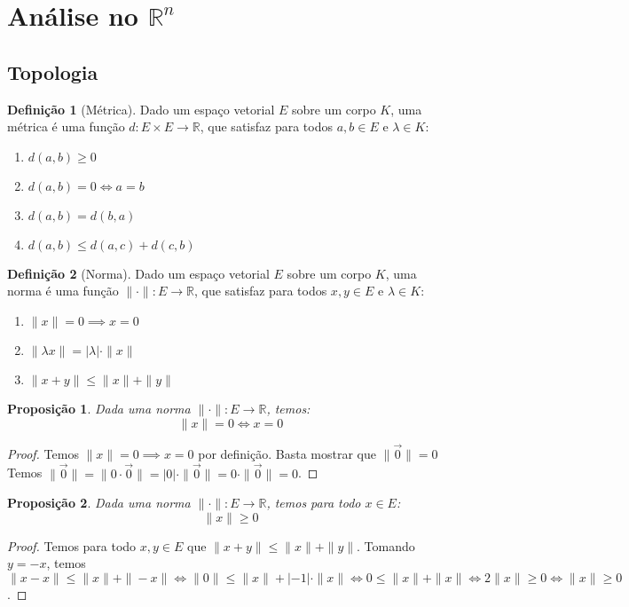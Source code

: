\documentclass{article}
\theoremstyle{plain}
\newtheorem{prop}{Proposição}[section]
\theoremstyle{definition}
\newtheorem{definicao}{Definição}[section]
\theoremstyle{remark}
\begin{document}
\section{Análise no $\mathbb{R}^n$}
\subsection{Topologia}
\begin{definicao}[Métrica]
	Dado um espaço vetorial $E$ sobre um corpo $K$, uma métrica é uma função $d: E\times E \to \mathbb{R}$, que satisfaz para todos $a,b\in E$ e $\lambda \in K$:
	\begin{enumerate}
		\item $d(a,b) \geq 0$
		\item $d(a,b) = 0 \iff a = b $
		\item $d(a,b) = d(b,a)$
		\item $ d(a,b) \leq d(a,c) + d(c,b)$
	\end{enumerate}
\end{definicao}
\begin{definicao}[Norma]
	Dado um espaço vetorial $E$ sobre um corpo $K$, uma norma é uma função $\| \cdot \|: E \to \mathbb{R}$, que satisfaz para todos $x,y\in E$ e $\lambda \in K$:

	\begin{enumerate}
		\item $\| x \| = 0 \implies x = 0 $
		\item $\| \lambda x \| = | \lambda | \cdot \| x \|$
		\item $ \| x+y \| \leq \| x \| + \| y \|$
	\end{enumerate}
\end{definicao}
\begin{prop}
	Dada uma norma $\| \cdot \|: E \to \mathbb{R}$, temos:
	$$ \| x\| = 0 \iff x = 0 $$
\end{prop}
\begin{proof}
	Temos $\| x \| =0 \implies x = 0$ por definição. Basta mostrar que $\| \vec{0} \| = 0 $
	Temos $\| \vec{0} \| = \| 0 \cdot \vec{0} \|  = |0| \cdot \| \vec{0} \| = 0 \cdot \|\vec{0} \| = 0$.
\end{proof}
\begin{prop}
	Dada uma norma $\| \cdot \|: E \to \mathbb{R}$, temos para todo $x\in E$:
	$$ \|x \| \geq 0 $$
\end{prop}
\begin{proof}
	Temos para todo $x,y \in E$ que $\| x+y\| \leq \|x \| + \| y \|$.  Tomando $y = - x$, temos $\| x-x\| \leq \| x\| + \| -x\| \iff \|0 \| \leq \|x\| + |-1| \cdot \| x\| \iff 0 \leq \|x\| + \|x\| \iff 2\|x\| \geq 0 \iff \|x\| \geq 0$.
\end{proof}
\end{document}
